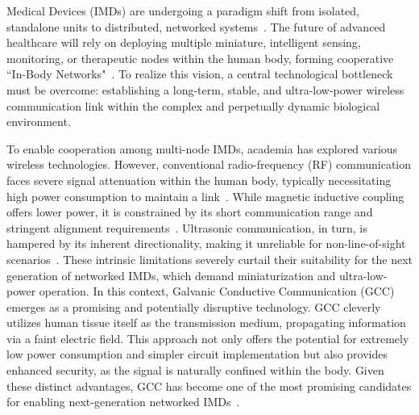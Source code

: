 \documentclass[journal]{IEEEtran}
\begin{document}
 Medical Devices (IMDs) are undergoing a paradigm shift from isolated, standalone units to distributed, networked systems~\cite{Ferguson2011WirelessCW,zrenner2002will,laizou1999signal,Germanovix2000DesignOA}. The future of advanced healthcare will rely on deploying multiple miniature, intelligent sensing, monitoring, or therapeutic nodes within the human body, forming cooperative ``In-Body Networks"~\cite{estudillo2010intrabody,warren2010wireless,lin2014design}. To realize this vision, a central technological bottleneck must be overcome: establishing a long-term, stable, and ultra-low-power wireless communication link within the complex and perpetually dynamic biological environment.

To enable cooperation among multi-node IMDs, academia has explored various wireless technologies. However, conventional radio-frequency (RF) communication faces severe signal attenuation within the human body, typically necessitating high power consumption to maintain a link~\cite{bose2018rf}. While magnetic inductive coupling offers lower power, it is constrained by its short communication range and stringent alignment requirements~\cite{li2018200mb}. Ultrasonic communication, in turn, is hampered by its inherent directionality, making it unreliable for non-line-of-sight scenarios~\cite{seyedi2013survey}. These intrinsic limitations severely curtail their suitability for the next generation of networked IMDs, which demand miniaturization and ultra-low-power operation. In this context, Galvanic Conductive Communication (GCC) emerges as a promising and potentially disruptive technology. GCC cleverly utilizes human tissue itself as the transmission medium, propagating information via a faint electric field. This approach not only offers the potential for extremely low power consumption and simpler circuit implementation but also provides enhanced security, as the signal is naturally confined within the body. Given these distinct advantages, GCC has become one of the most promising candidates for enabling next-generation networked IMDs~\cite{wu2020equivalent, opie2004heart, Wegmueller2010Signal, 2016Galvanically}.
\end{document}
